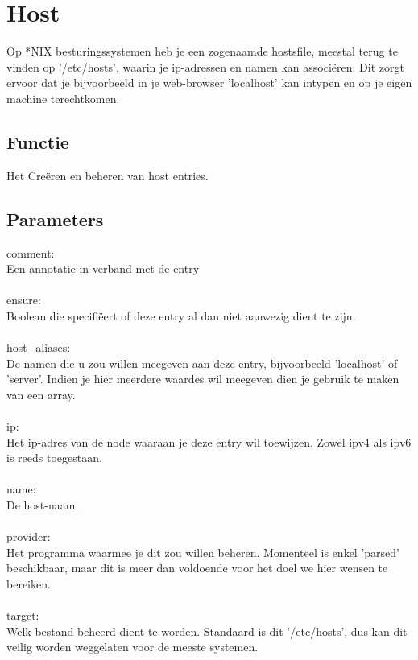 \section{Host}
Op *NIX besturingssystemen heb je een zogenaamde hostsfile, meestal terug te vinden op '/etc/hosts', waarin je ip-adressen en namen kan associ\"{e}ren. Dit zorgt ervoor dat je bijvoorbeeld in je web-browser 'localhost' kan intypen en op je eigen machine terechtkomen.

\subsection{Functie}
Het Cre\"{e}ren en beheren van host entries.

\subsection{Parameters}
comment:\\
Een annotatie in verband met de entry\\\\
%
ensure:\\
Boolean die specifi\"{e}ert of deze entry al dan niet aanwezig dient te zijn.\\\\
%
host\_aliases:\\
De namen die u zou willen meegeven aan deze entry, bijvoorbeeld 'localhost' of 'server'. Indien je hier meerdere waardes wil meegeven dien je gebruik te maken van een array.\\\\
%
ip:\\
Het ip-adres van de node waaraan je deze entry wil toewijzen. Zowel ipv4 als ipv6 is reeds toegestaan.\\\\
%
name:\\
De host-naam.\\\\
%
provider:\\
Het programma waarmee je dit zou willen beheren. Momenteel is enkel 'parsed' beschikbaar, maar dit is meer dan voldoende voor het doel we hier wensen te bereiken.\\\\
%
target:\\
Welk bestand beheerd dient te worden. Standaard is dit '/etc/hosts', dus kan dit veilig worden weggelaten voor de meeste systemen.\\\\

